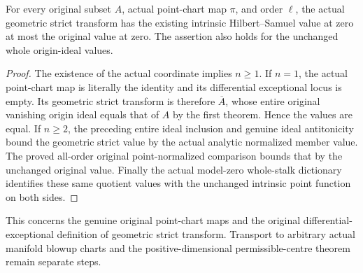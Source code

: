 \begin{theorem}
\label{hir:actual-geometric-point-bennett-all-orders}
\leanok
For every original subset $A$, actual point-chart map $\pi$, and order
$\ell$, the actual geometric strict transform has the existing intrinsic
Hilbert--Samuel value at zero at most the original value at zero.
The assertion also holds for the unchanged whole origin-ideal values.
\end{theorem}
\begin{proof}
The existence of the actual coordinate implies $n\ge1$. If $n=1$, the
actual point-chart map is literally the identity and its differential
exceptional locus is empty. Its geometric strict transform is therefore
$\overline A$, whose entire original vanishing origin ideal equals
that of $A$ by the first theorem. Hence the values are equal.
If $n\ge2$, the preceding entire ideal inclusion and genuine ideal
antitonicity bound the geometric strict value by the actual analytic
normalized member value. The proved all-order original point-normalized
comparison bounds that by the unchanged original value. Finally the
actual model-zero whole-stalk dictionary identifies these same quotient
values with the unchanged intrinsic point function on both sides.
\end{proof}

This concerns the genuine original point-chart maps and the original
differential-exceptional definition of geometric strict transform.
Transport to arbitrary actual manifold blowup charts and the
positive-dimensional permissible-centre theorem remain separate steps.
